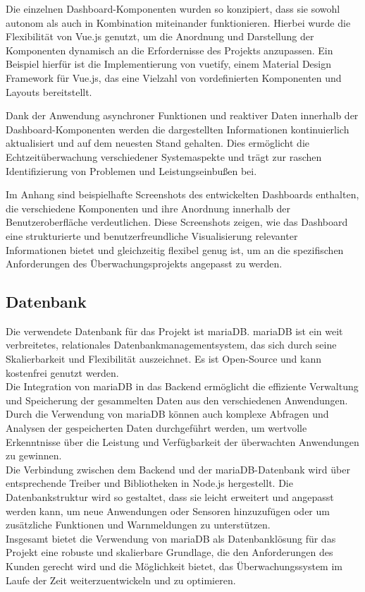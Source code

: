 \begin{flushleft}
Die einzelnen Dashboard-Komponenten wurden so konzipiert, dass sie sowohl autonom als auch in Kombination miteinander funktionieren. Hierbei wurde die Flexibilität von Vue.js genutzt, um die Anordnung und Darstellung der Komponenten dynamisch an die Erfordernisse des Projekts anzupassen. Ein Beispiel hierfür ist die Implementierung von vuetify, einem Material Design Framework für Vue.js, das eine Vielzahl von vordefinierten Komponenten und Layouts bereitstellt.

Dank der Anwendung asynchroner Funktionen und reaktiver Daten innerhalb der Dashboard-Komponenten werden die dargestellten Informationen kontinuierlich aktualisiert und auf dem neuesten Stand gehalten. Dies ermöglicht die Echtzeitüberwachung verschiedener Systemaspekte und trägt zur raschen Identifizierung von Problemen und Leistungseinbußen bei.

Im Anhang sind beispielhafte Screenshots des entwickelten Dashboards enthalten, die verschiedene Komponenten und ihre Anordnung innerhalb der Benutzeroberfläche verdeutlichen. Diese Screenshots zeigen, wie das Dashboard eine strukturierte und benutzerfreundliche Visualisierung relevanter Informationen bietet und gleichzeitig flexibel genug ist, um an die spezifischen Anforderungen des Überwachungsprojekts angepasst zu werden.

\subsection{Datenbank}
Die verwendete Datenbank für das Projekt ist mariaDB. mariaDB ist ein weit verbreitetes, relationales Datenbankmanagementsystem, das sich durch seine Skalierbarkeit und Flexibilität auszeichnet. Es ist Open-Source und kann kostenfrei genutzt werden.\\
Die Integration von mariaDB in das Backend ermöglicht die effiziente Verwaltung und Speicherung der gesammelten Daten aus den verschiedenen Anwendungen. Durch die Verwendung von mariaDB können auch komplexe Abfragen und Analysen der gespeicherten Daten durchgeführt werden, um wertvolle Erkenntnisse über die Leistung und Verfügbarkeit der überwachten Anwendungen zu gewinnen.\\
Die Verbindung zwischen dem Backend und der mariaDB-Datenbank wird über entsprechende Treiber und Bibliotheken in Node.js hergestellt. Die Datenbankstruktur wird so gestaltet, dass sie leicht erweitert und angepasst werden kann, um neue Anwendungen oder Sensoren hinzuzufügen oder um zusätzliche Funktionen und Warnmeldungen zu unterstützen.\\
Insgesamt bietet die Verwendung von mariaDB als Datenbanklösung für das Projekt eine robuste und skalierbare Grundlage, die den Anforderungen des Kunden gerecht wird und die Möglichkeit bietet, das Überwachungssystem im Laufe der Zeit weiterzuentwickeln und zu optimieren.\\



\end{flushleft}
